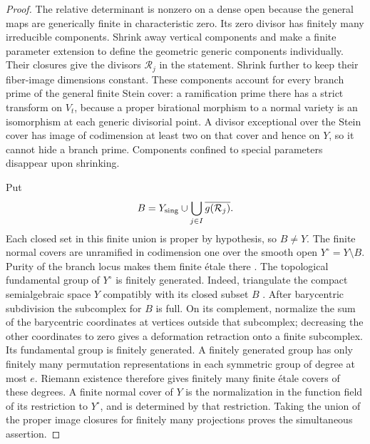 \begin{proof}
The relative determinant is nonzero on a dense open because
the general maps are generically finite in characteristic zero.
Its zero divisor has finitely many irreducible components.
Shrink away vertical components and make a finite parameter extension
to define the geometric generic components individually. Their
closures give the divisors $\mathcal R_j$ in the statement.
Shrink further to keep their fiber-image dimensions constant.
These components account for every branch prime of the general
finite Stein cover: a ramification prime there has a strict
transform on $V_t$, because a proper birational morphism to a
normal variety is an isomorphism at each generic divisorial
point. A divisor exceptional over the Stein cover has image of
codimension at least two on that cover and hence on $Y$, so it
cannot hide a branch prime. Components confined to special
parameters disappear upon shrinking.

Put
\[
 B=Y_{\rm sing}\cup\bigcup_{j\in I}\overline{g(\mathcal R_j)}.
\]
Each closed set in this finite union is proper by hypothesis,
so $B\ne Y$. The finite normal covers are unramified in
codimension one over the smooth open $Y^\circ=Y\setminus B$.
Purity of the branch locus makes them finite \'etale there
\cite[Expos\'e~X, Theorem~3.1]{SGA1}.
The topological fundamental group of $Y^\circ$ is finitely
generated. Indeed, triangulate the compact semialgebraic space
$Y$ compatibly with its closed subset $B$
\cite[Theorem~1.10 in the author's notes]{Coste2007}.
After barycentric subdivision the subcomplex for $B$ is full.
On its complement, normalize the sum of the barycentric
coordinates at vertices outside that subcomplex; decreasing
the other coordinates to zero gives a deformation retraction
onto a finite subcomplex. Its fundamental group is finitely
generated. A finitely generated group has only
finitely many permutation representations in each symmetric
group of degree at most $e$. Riemann existence
\cite[Expos\'e~XII, Theorem~5.1]{SGA1} therefore gives
finitely many finite \'etale covers of these degrees. A finite
normal cover of $Y$ is the normalization in the function field
of its restriction to $Y^\circ$, and is determined by that
restriction. Taking the union of the proper image closures for
finitely many projections proves the simultaneous assertion.
\end{proof}
